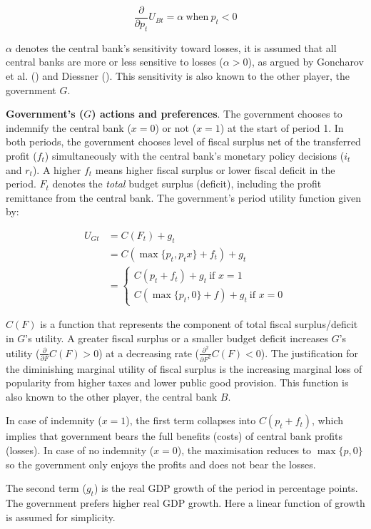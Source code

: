 \documentclass[
  a4paper,
  abstract=true]{scrartcl}
\theoremstyle{definition}
\begin{document}
\[
\frac{\partial}{\partial p_t}U_{Bt}=\alpha~\text{when}~p_t<0
\]

\(\alpha\) denotes the central bank's sensitivity toward losses, it is
assumed that all central banks are more or less sensitive to losses
(\(\alpha>0\)), as argued by Goncharov et al.
() and Diessner
(). This sensitivity is also known to
the other player, the government \(G\).

\textbf{Government's (}\(G\)\textbf{) actions and preferences}. The
government chooses to indemnify the central bank (\(x=0\)) or not
(\(x=1\)) at the start of period 1. In both periods, the government
chooses level of fiscal surplus net of the transferred profit (\(f_t\))
simultaneously with the central bank's monetary policy decisions
(\(i_t\) and \(r_t\)). A higher \(f_t\) means higher fiscal surplus or
lower fiscal deficit in the period. \(F_t\) denotes the \emph{total}
budget surplus (deficit), including the profit remittance from the
central bank. The government's period utility function given by:

\begin{align*}
U_{Gt} &=C(F_t)+ g_t \\
&=C(\max\{p_t,p_tx\}+f_t)+ g_t \\
&=\begin{cases}
C(p_t+f_t)+g_t~\text{if } x=1 \\
C(\max\{p_t,0\}+f)+g_t~\text{if } x=0
\end{cases}
\end{align*}

\(C( F)\) is a function that represents the component of total fiscal
surplus/deficit in \(G\)'s utility. A greater fiscal surplus or a
smaller budget deficit increases \(G\)'s utility
(\(\frac{\partial}{\partial F}C(F)>0\)) at a decreasing rate
(\(\frac{\partial^2}{\partial F^2}C(F)<0\)). The justification for the
diminishing marginal utility of fiscal surplus is the increasing
marginal loss of popularity from higher taxes and lower public good
provision. This function is also known to the other player, the central
bank \(B\).

In case of indemnity (\(x=1\)), the first term collapses into
\(C(p_t+f_t)\), which implies that government bears the full benefits
(costs) of central bank profits (losses). In case of no indemnity
(\(x=0\)), the maximisation reduces to \(\max\{p,0\}\) so the government
only enjoys the profits and does not bear the losses.

The second term (\(g_t\)) is the real GDP growth of the period in
percentage points. The government prefers higher real GDP growth. Here a
linear function of growth is assumed for simplicity.
\end{document}
